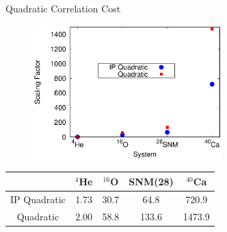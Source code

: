 \documentclass{beamer}
\begin{document}
\begin{frame}{Quadratic Correlation Cost}
\begin{figure}[h]
   \centering
   \includegraphics[width=0.65\textwidth]{figures/scaling.eps}
\end{figure}
\vspace{-0.2cm}
\begin{table}[h!]
   \centering
   \begin{tabular}{ccccc}
      \hline \hline
       & $^{4}$He & $^{16}$O & SNM(28) & $^{40}$Ca \\
      \hline
      IP Quadratic & 1.73 & 30.7 & 64.8 & 720.9 \\
      Quadratic & 2.00 & 58.8 & 133.6 & 1473.9 \\
      \hline \hline
   \end{tabular}
\end{table}
\end{frame}
\end{document}
